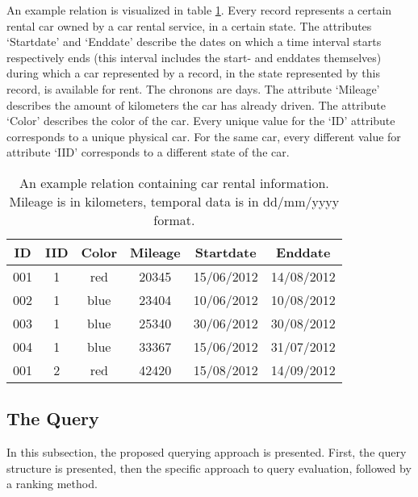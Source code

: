 An example relation is visualized in table \ref{table:example}. Every record represents a certain rental car owned by a car rental service, in a certain state. The attributes `Startdate' and `Enddate' describe the dates on which a time interval starts respectively ends (this interval includes the start- and enddates themselves) during which a car represented by a record, in the state represented by this record, is available for rent. The chronons are days. The attribute `Mileage' describes the amount of kilometers the car has already driven. The attribute `Color' describes the color of the car. Every unique value for the `ID' attribute corresponds to a unique physical car. For the same car, every different value for attribute `IID' corresponds to a different state of the car. %
\vspace{-15pt}
\begin{table}
\caption{An example relation containing car rental information. Mileage is in kilometers, temporal data is in dd/mm/yyyy format.}
\centering
\begin{tabular}{c c c c c c}
\hline
\textbf{ID} & \textbf{IID} & \textbf{Color} & \textbf{Mileage} & \textbf{Startdate} & \textbf{Enddate} \\
\hline
001 & 1 & red & 20345 & 15/06/2012 & 14/08/2012 \\
002 & 1 & blue & 23404 & 10/06/2012 & 10/08/2012 \\
003 & 1 & blue & 25340 & 30/06/2012 & 30/08/2012 \\
004 & 1 & blue & 33367 & 15/06/2012 & 31/07/2012 \\
001 & 2 & red & 42420 & 15/08/2012 & 14/09/2012 \\
\hline
\end{tabular}
\label{table:example}
\end{table}
\vspace{-25pt}



\subsection{The Query}
In this subsection, the proposed querying approach is presented. First, the query structure is presented, then the specific approach to query evaluation, followed by a ranking method.

